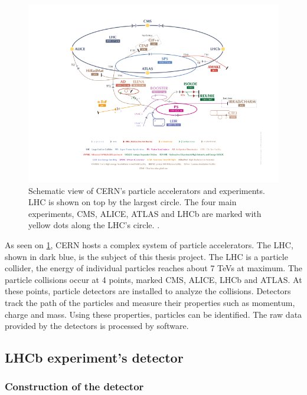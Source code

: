 \documentclass[12pt]{article}
\begin{document}
\begin{figure}[H]
	\includegraphics[width=\textwidth]{accelerator_complex}
	\caption{Schematic view of CERN's particle accelerators and experiments. LHC is shown on top by the largest circle. The four main experiments, CMS, ALICE, ATLAS and LHCb are marked with yellow dots along the LHC's circle. \cite{cern_document_server}.}
	\label{fig_accel_complex}
\end{figure}

As seen on \ref{fig_accel_complex}, CERN hosts a complex system of particle accelerators.
The LHC, shown in dark blue, is the subject of this thesis project. The LHC is a particle collider, the energy of individual particles reaches about 7 TeVs at maximum. The particle collisions occur at 4 points, marked CMS, ALICE, LHCb and ATLAS. At these points, particle detectors are installed to analyze the collisions. Detectors track the path of the particles and measure their properties such as momentum, charge and mass. Using these properties, particles can be identified. The raw data provided by the detectors is processed by software.


\subsection{LHCb experiment's detector}\label{sec_lhcb_detector}	

\subsubsection{Construction of the detector}\label{sec_lhcb_det_constr}
\end{document}
